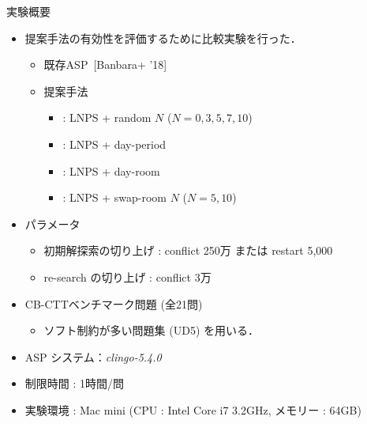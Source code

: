 \documentclass[11pt,dvipdfmx,handout]{beamer}
\begin{document}
\begin{frame}{実験概要}
  \begin{itemize}
  \item 提案手法の有効性を評価するために比較実験を行った．
    \begin{itemize}
    \item 既存ASP~[Banbara+ '18]
    \item 提案手法
      \begin{itemize}
      \item {}: LNPS + random $N$ ($N=0, 3, 5, 7, 10$)
      \item {}: LNPS + day-period
      \item {}: LNPS + day-room
      \item {}: LNPS + swap-room $N$ ($N=5, 10$)
      \end{itemize}
    \end{itemize}
  \item パラメータ
   \begin{itemize}
    \item 初期解探索の切り上げ : conflict 250万 または restart 5,000
    \item re-search の切り上げ : conflict 3万
   \end{itemize}
  \item CB-CTTベンチマーク問題 (全21問)
    \begin{itemize}
    \item ソフト制約が多い問題集 (UD5) を用いる．
    \end{itemize}
  \item ASP システム：\textit{clingo-5.4.0}
  \item 制限時間 : 1時間/問
  \item 実験環境 : Mac mini (CPU : Intel Core i7 3.2GHz, メモリー : 64GB) 
  \end{itemize}
\end{frame}
\newenvironment{tableA}{%
  \renewcommand{\arraystretch}{0.8}
  \begin{tabular}[t]{c||r|r|r|r|r|r|r|r}
    \lw{問題名} & \lw{既存ASP} & \multicolumn{5}{c}{提案手法}\\\cline{3-9}
     &  & R-0 & R-3 & R-5 & DP & DR & SR-5 & SR-10\\\hline
    }{%
    \hline
  \end{tabular}
}
\end{document}
